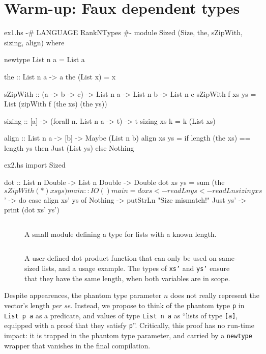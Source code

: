 \documentclass[format=sigplan, review=false, screen=true]{acmart}
\begin{document}
\section{Warm-up: Faux dependent types}

\begin{filecontents*}{ex1.hs}  
{-# LANGUAGE RankNTypes #-}
module Sized (Size, the, sZipWith, sizing, align) where

newtype List n a = List a

the :: List n a -> a
the (List x) = x

sZipWith ::
  (a -> b -> c) -> List n a -> List n b -> List n c
sZipWith f xs ys = List (zipWith f (the xs) (the ys))
  
sizing :: [a] -> (forall n. List n a -> t) -> t
sizing xs k = k (List xs)

align :: List n a -> [b] -> Maybe (List n b)
align xs ys = if length (the xs) == length ys
              then Just (List ys)
              else Nothing
\end{filecontents*}

\begin{filecontents*}{ex2.hs}
import Sized

dot :: List n Double -> List n Double -> Double
dot xs ys = sum (the $ sZipWith (*) xs ys)

main :: IO ()
main = do
  xs <- readLn
  ys <- readLn
  sizing xs $ \xs' -> do
    case align xs' ys of
      Nothing  -> putStrLn "Size mismatch!"
      Just ys' -> print (dot xs' ys')
\end{filecontents*}

\begin{figure}
    \inputminted{haskell}{ex1.hs}
  \caption{A small module defining a type for lists with a known length. \label{sizing}}
\end{figure}
\begin{figure}
    \inputminted{haskell}{ex2.hs}
    \caption{A user-defined dot product function that can only be used on same-sized lists,
      and a usage example. The types of \texttt{xs'} and \texttt{ys'} ensure that they have
      the same length, when both variables are in scope.\label{dot-product}}
\end{figure}

Despite  appearences, the phantom type parameter $n$ does not really represent the vector's length
{\em per se}. Instead, we propose to think of the phantom type \texttt{p} in \texttt{List p a} as a predicate,
and values of type \texttt{List n a} as ``lists of type \texttt{[a]}, equipped with a proof
that they satisfy \texttt{p}''. Critically, this proof has no run-time impact: it is trapped in the
phantom type parameter, and carried by a \texttt{newtype} wrapper that vanishes in
the final compilation.
\end{document}
